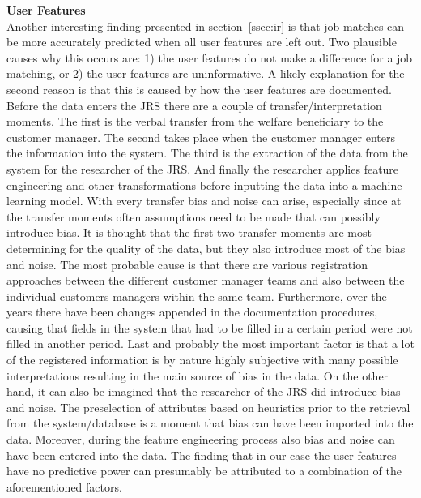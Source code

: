 \noindent
\textbf{User Features}\\
Another interesting finding presented in section~\ref{ssec:ir} is that job matches can be more accurately predicted when all user features are left out.  
Two plausible causes why this occurs are: 1) the user features do not make a difference for a job matching, or 2) the user features are uninformative.
A likely explanation for the second reason is that this is caused by how the user features are documented.
Before the data enters the JRS there are a couple of transfer/interpretation moments. 
The first is the verbal transfer from the welfare beneficiary to the customer manager.
The second takes place when the customer manager enters the information into the system.
The third is the extraction of the data from the system for the researcher of the JRS.
And finally the researcher applies feature engineering and other transformations before inputting the data into a machine learning model.
With every transfer bias and noise can arise, especially since at the transfer moments often assumptions need to be made that can possibly introduce bias.
It is thought that the first two transfer moments are most determining for the quality of the data, but they also introduce most of the bias and noise. The most probable cause is that there are various registration approaches between the different customer manager teams and also between the individual customers managers within the same team. 
Furthermore, over the years there have been changes appended in the documentation procedures, causing that fields in the system that had to be filled in a certain period were not filled  in another period.
Last and probably the most important factor is that a lot of the registered information is by nature highly subjective with many possible interpretations resulting in the main source of bias in the data. 
On the other hand, it can also be imagined that the researcher of the JRS did introduce bias and noise.
The preselection of attributes based on heuristics prior to the retrieval from the system/database is a moment that bias can have been imported into the data.
Moreover, during the feature engineering process also bias and noise can have been entered into the data.
The finding that in our case the user features have no predictive power can presumably be attributed to a combination of the aforementioned factors. 

